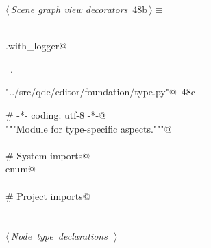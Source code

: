 \documentclass[
    a4paper,      %
    10pt,         %
    openright,    %
    notitlepage,  %
    parskip=half, %
]{scrreprt}       %
\theoremstyle{definition}                    %
\begin{document}
\begin{flushleft} \small
\begin{minipage}{\linewidth}\label{scrap59}\raggedright\small
{} $\langle\,${\itshape Scene graph view decorators}\nobreak\ {\footnotesize {48b}}$\,\rangle\equiv$
\vspace{-1ex}
\begin{list}{}{} \item
\mbox{}\lstinline@@\\
\mbox{}\lstinline@common.with_logger@\\
\mbox{}\lstinline@@{\NWsep}
\end{list}
\vspace{-1.5ex}
\footnotesize
\begin{list}{}{\setlength{\itemsep}{-\parsep}\setlength{\itemindent}{-\leftmargin}}
\item \NWtxtMacroRefIn\ .

\item{}
\end{list}
\end{minipage}\vspace{4ex}
\end{flushleft}
\begin{flushleft} \small
\begin{minipage}{\linewidth}\label{scrap60}\raggedright\small
{} \verb@"../src/qde/editor/foundation/type.py"@\nobreak\ {\footnotesize {48c}}$\equiv$
\vspace{-1ex}
\begin{list}{}{} \item
\mbox{}\lstinline@# -*- coding: utf-8 -*-@\\
\mbox{}\lstinline@"""Module for type-specific aspects."""@\\
\mbox{}\lstinline@@\\
\mbox{}\lstinline@# System imports@\\
\mbox{}\lstinline@import enum@\\
\mbox{}\lstinline@@\\
\mbox{}\lstinline@# Project imports@\\
\mbox{}\lstinline@@\\
\mbox{}\lstinline@@\\
\mbox{}\lstinline@@\hbox{$\langle\,${\itshape Node type declarations}\nobreak\ {\footnotesize {}}$\,\rangle$}\lstinline@@\\
\mbox{}\lstinline@@{\NWsep}
\end{list}
\vspace{-1.5ex}
\footnotesize
\begin{list}{}{\setlength{\itemsep}{-\parsep}\setlength{\itemindent}{-\leftmargin}}

\item{}
\end{list}
\end{minipage}\vspace{4ex}
\end{flushleft}
\end{document}
